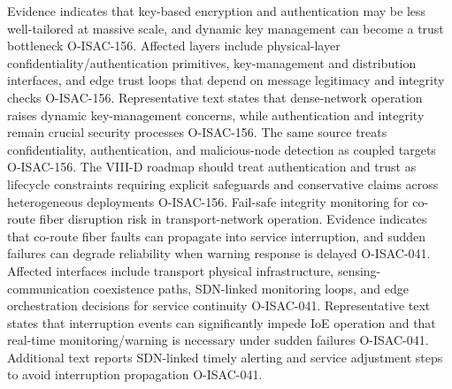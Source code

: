  Evidence indicates that key-based encryption and authentication may be less well-tailored at massive scale, and dynamic key management can become a trust bottleneck O-ISAC-156.\markdownRendererOlItemEnd 
{} Affected layers include physical-layer confidentiality/authentication primitives, key-management and distribution interfaces, and edge trust loops that depend on message legitimacy and integrity checks O-ISAC-156.\markdownRendererOlItemEnd 
{} Representative text states that dense-network operation raises dynamic key-management concerns, while authentication and integrity remain crucial security processes O-ISAC-156. The same source treats confidentiality, authentication, and malicious-node detection as coupled targets O-ISAC-156.\markdownRendererOlItemEnd 
{} The VIII-D roadmap should treat authentication and trust as lifecycle constraints requiring explicit safeguards and conservative claims across heterogeneous deployments O-ISAC-156.\markdownRendererOlItemEnd 
\markdownRendererOlEnd \markdownRendererInterblockSeparator
{}
\markdownRendererSectionEnd \markdownRendererSectionBegin
{}\markdownRendererInterblockSeparator
{}\markdownRendererOlBegin
{} Fail-safe integrity monitoring for co-route fiber disruption risk in transport-network operation.\markdownRendererOlItemEnd 
{} Evidence indicates that co-route fiber faults can propagate into service interruption, and sudden failures can degrade reliability when warning response is delayed O-ISAC-041.\markdownRendererOlItemEnd 
{} Affected interfaces include transport physical infrastructure, sensing-communication coexistence paths, SDN-linked monitoring loops, and edge orchestration decisions for service continuity O-ISAC-041.\markdownRendererOlItemEnd 
{} Representative text states that interruption events can significantly impede IoE operation and that real-time monitoring/warning is necessary under sudden failures O-ISAC-041. Additional text reports SDN-linked timely alerting and service adjustment steps to avoid interruption propagation O-ISAC-041.\markdownRendererOlItemEnd 
